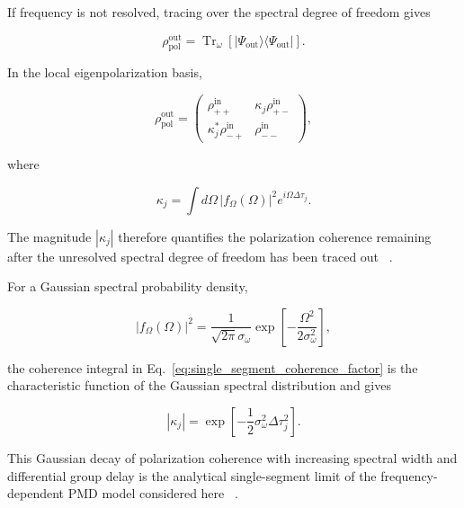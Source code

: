 If frequency is not resolved, tracing over the spectral degree of freedom gives

\begin{equation}
\rho_{\mathrm{pol}}^{\mathrm{out}}
=
\operatorname{Tr}_{\omega}
\left[
|\Psi_{\mathrm{out}}\rangle
\langle\Psi_{\mathrm{out}}|
\right].
\label{eq:single_segment_spectral_partial_trace}
\end{equation}

In the local eigenpolarization basis,

\begin{equation}
\rho_{\mathrm{pol}}^{\mathrm{out}}
=
\begin{pmatrix}
\rho_{++}^{\mathrm{in}}
&
\kappa_j\rho_{+-}^{\mathrm{in}}
\\
\kappa_j^*\rho_{-+}^{\mathrm{in}}
&
\rho_{--}^{\mathrm{in}}
\end{pmatrix},
\label{eq:single_segment_reduced_polarization_state}
\end{equation}

where

\begin{equation}
\boxed{
\kappa_j
=
\int d\Omega\,
|f_\Omega(\Omega)|^2
e^{i\Omega\Delta\tau_j}.
}
\label{eq:single_segment_coherence_factor}
\end{equation}

The magnitude \( |\kappa_j| \) therefore quantifies the polarization coherence
remaining after the unresolved spectral degree of freedom has been traced out
~\cite{poon_law_stochastic_pmd_2008}.

For a Gaussian spectral probability density,

\begin{equation}
|f_\Omega(\Omega)|^2
=
\frac{1}{\sqrt{2\pi}\sigma_\omega}
\exp
\left[
-\frac{\Omega^2}{2\sigma_\omega^2}
\right],
\label{eq:gaussian_spectral_probability_density}
\end{equation}

the coherence integral in
Eq.~\eqref{eq:single_segment_coherence_factor} is the characteristic function of
the Gaussian spectral distribution and gives

\begin{equation}
\boxed{
|\kappa_j|
=
\exp
\left[
-\frac{1}{2}
\sigma_\omega^2
\Delta\tau_j^2
\right].
}
\label{eq:gaussian_pmd_coherence_factor}
\end{equation}

This Gaussian decay of polarization coherence with increasing spectral width and
differential group delay is the analytical single-segment limit of the
frequency-dependent PMD model considered here
~\cite{poon_law_stochastic_pmd_2008,
riccardi_polarization_entanglement_distribution_2021}.


